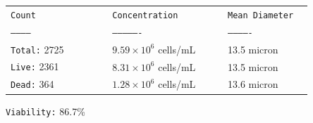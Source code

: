 \documentclass[UTF8,10pt,a4paper,fontset=fandol]{ctexart}
\newcommand{\fieldvalue}[1]{#1}
\begin{document}
\begin{center}
\begin{tabular}{@{}p{0.30\linewidth}p{0.34\linewidth}p{0.25\linewidth}@{}}
\texttt{Count} & \texttt{Concentration} & \texttt{Mean Diameter} \\
\texttt{------------} & \texttt{----------------} & \texttt{-------------} \\[0.2em]
\texttt{Total:} %
\fieldvalue{2725}
&
\fieldvalue{$9.59\times 10^{6}$ cells/mL}
&
\fieldvalue{13.5 micron}
\\
\texttt{Live:} %
\fieldvalue{2361}
&
\fieldvalue{$8.31\times 10^{6}$ cells/mL}
&
\fieldvalue{13.5 micron}
\\
\texttt{Dead:} %
\fieldvalue{364}
&
\fieldvalue{$1.28\times 10^{6}$ cells/mL}
&
\fieldvalue{13.6 micron}
\end{tabular}
\end{center}

\noindent\texttt{Viability:} %
\fieldvalue{86.7\%}

\vspace{1em}

\noindent
\begin{minipage}[t]{0.42\linewidth}
\centering
{}
\end{minipage}
\hfill
\begin{minipage}[t]{0.42\linewidth}
\centering
{}
\end{minipage}

\vspace{2.5em}

\noindent
\begin{minipage}[t]{0.42\linewidth}
\centering
{}
\end{minipage}
\hfill
\begin{minipage}[t]{0.42\linewidth}
\centering
{}
\end{minipage}
\end{document}
